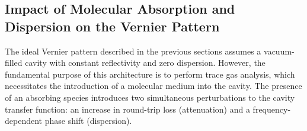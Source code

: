 \documentclass[8pt,a4paper]{report}
\begin{document}
%	
%	
	
	\subsection{Impact of Molecular Absorption and Dispersion on the Vernier Pattern}
	
	The ideal Vernier pattern described in the previous sections assumes a vacuum-filled cavity with constant reflectivity and zero dispersion. However, the fundamental purpose of this architecture is to perform trace gas analysis, which necessitates the introduction of a molecular medium into the cavity. The presence of an absorbing species introduces two simultaneous perturbations to the cavity transfer function: an increase in round-trip loss (attenuation) and a frequency-dependent phase shift (dispersion).
	
\end{document}
